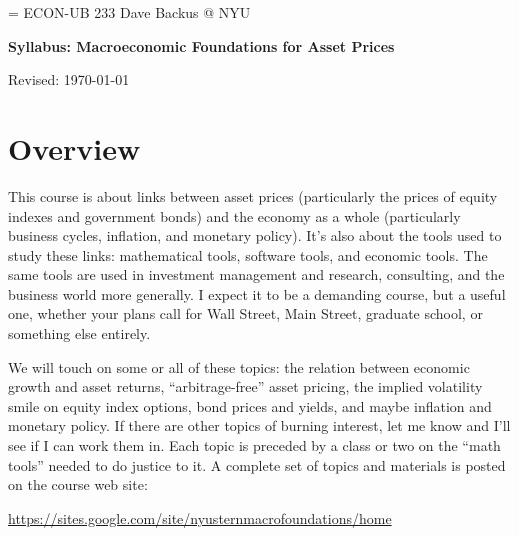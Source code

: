 \documentclass[11pt]{article}
\begin{document}
\parskip=\bigskipamount
\parindent=0.0in
\thispagestyle{empty}
{\large ECON-UB 233 \hfill Dave Backus @ NYU}

\bigskip\bigskip
\centerline{\Large \bf Syllabus:  Macroeconomic Foundations for Asset Prices}
\centerline{Revised: \today}


\section*{Overview}

This course is about links between asset prices
(particularly the prices of equity indexes and government bonds)
and the economy as a whole (particularly business cycles, inflation, and monetary policy).
It's also about the tools used to study these links:
mathematical tools, software tools, and economic tools.
The same tools are used in
investment management and research, consulting, and the business world more generally.
I expect it to be a demanding course, but a useful one,
whether your plans call for Wall Street, Main Street,
graduate school, or something else entirely.

\begin{comment}
The skills we'll develop to collect, manipulate,
and interpret data
are among the most valuable you can have in modern life,
and they're not easy to learn on your own.
You will learn to think about data from the
perspective of quantitative models,
to use professional software
(Matlab, not Excel!) to manipulate data,
and to use data to apply and develop models.
Our applications are to macroeconomics and finance,
but the skills you acquire here are general ones.
\end{comment}

We will touch on some or all of these topics:
the relation between economic growth and asset returns,
``arbitrage-free'' asset pricing,
the implied volatility smile on equity index options,
bond prices and yields, and maybe inflation and monetary policy.
If there are other topics of burning interest, let me know
and I'll see if I can work them in.
Each topic is preceded by a class or two on
the ``math tools'' needed to do justice to it.
A complete set of topics and materials is posted on
the course web site:

\vspace*{\parskip}
\centerline{\url{https://sites.google.com/site/nyusternmacrofoundations/home}}
\end{document}
